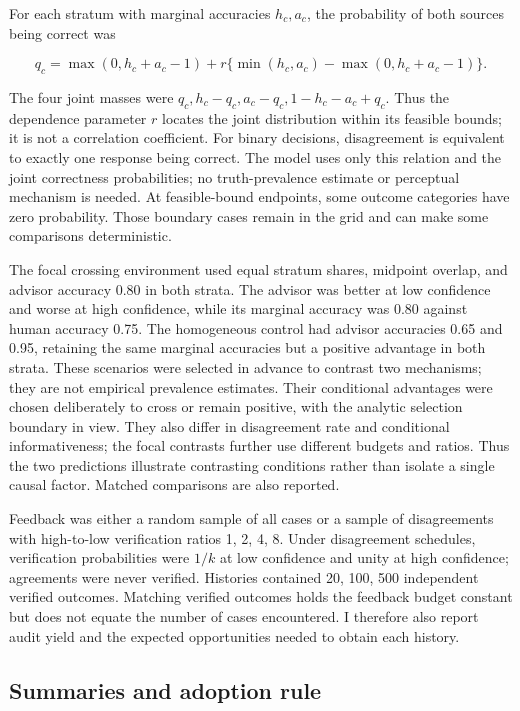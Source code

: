 \documentclass[
  british,
  11pt,
]{article}
\begin{document}
For each stratum with marginal accuracies \(h_c,a_c\), the probability
of both sources being correct was

\[q_c=\max(0,h_c+a_c-1)+r\{\min(h_c,a_c)-\max(0,h_c+a_c-1)\}.\]

The four joint masses were \(q_c,h_c-q_c,a_c-q_c,1-h_c-a_c+q_c\). Thus
the dependence parameter \(r\) locates the joint distribution within its
feasible bounds; it is not a correlation coefficient. For binary
decisions, disagreement is equivalent to exactly one response being
correct. The model uses only this relation and the joint correctness
probabilities; no truth-prevalence estimate or perceptual mechanism is
needed. At feasible-bound endpoints, some outcome categories have zero
probability. Those boundary cases remain in the grid and can make some
comparisons deterministic.

The focal crossing environment used equal stratum shares, midpoint
overlap, and advisor accuracy 0.80 in both strata. The advisor was
better at low confidence and worse at high confidence, while its
marginal accuracy was 0.80 against human accuracy 0.75. The homogeneous
control had advisor accuracies 0.65 and 0.95, retaining the same
marginal accuracies but a positive advantage in both strata. These
scenarios were selected in advance to contrast two mechanisms; they are
not empirical prevalence estimates. Their conditional advantages were
chosen deliberately to cross or remain positive, with the analytic
selection boundary in view. They also differ in disagreement rate and
conditional informativeness; the focal contrasts further use different
budgets and ratios. Thus the two predictions illustrate contrasting
conditions rather than isolate a single causal factor. Matched
comparisons are also reported.

Feedback was either a random sample of all cases or a sample of
disagreements with high-to-low verification ratios 1, 2, 4, 8. Under
disagreement schedules, verification probabilities were \(1/k\) at low
confidence and unity at high confidence; agreements were never verified.
Histories contained 20, 100, 500 independent verified outcomes. Matching
verified outcomes holds the feedback budget constant but does not equate
the number of cases encountered. I therefore also report audit yield and
the expected opportunities needed to obtain each history.

\subsection{Summaries and adoption
rule}\label{summaries-and-adoption-rule}
\end{document}
